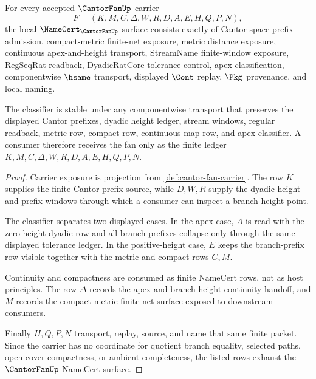 \begin{theorem}\label{thm:cantor-fan-namecert}
For every accepted $\CantorFanUp$ carrier
$$
F=(K,M,C,\Delta,W,R,D,A,E,H,Q,P,N),
$$
the local $\NameCert_{\CantorFanUp}$ surface consists exactly of Cantor-space prefix admission, compact-metric finite-net exposure, metric distance exposure, continuous apex-and-height transport, StreamName finite-window exposure, RegSeqRat readback, DyadicRatCore tolerance control, apex classification, componentwise $\hsame$ transport, displayed $\Cont$ replay, $\Pkg$ provenance, and local naming.

The classifier is stable under any componentwise transport that preserves the displayed Cantor prefixes, dyadic height ledger, stream windows, regular readback, metric row, compact row, continuous-map row, and apex classifier. A consumer therefore receives the fan only as the finite ledger $K,M,C,\Delta,W,R,D,A,E,H,Q,P,N$.
\end{theorem}
\begin{proof}
Carrier exposure is projection from \autoref{def:cantor-fan-carrier}. The row $K$ supplies the finite Cantor-prefix source, while $D,W,R$ supply the dyadic height and prefix windows through which a consumer can inspect a branch-height point.

The classifier separates two displayed cases. In the apex case, $A$ is read with the zero-height dyadic row and all branch prefixes collapse only through the same displayed tolerance ledger. In the positive-height case, $E$ keeps the branch-prefix row visible together with the metric and compact rows $C,M$.

Continuity and compactness are consumed as finite NameCert rows, not as host principles. The row $\Delta$ records the apex and branch-height continuity handoff, and $M$ records the compact-metric finite-net surface exposed to downstream consumers.

Finally $H,Q,P,N$ transport, replay, source, and name that same finite packet. Since the carrier has no coordinate for quotient branch equality, selected paths, open-cover compactness, or ambient completeness, the listed rows exhaust the $\CantorFanUp$ NameCert surface.
\end{proof}


